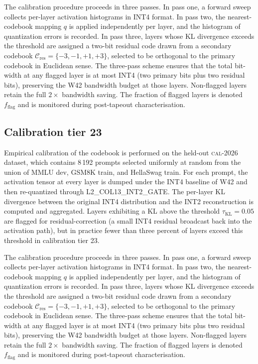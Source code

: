 The calibration procedure proceeds in three passes. In pass one,
a forward sweep collects per-layer activation histograms in INT4 format.
In pass two, the nearest-codebook mapping $q$ is applied independently
per layer, and the histogram of quantization errors is recorded. In pass
three, layers whose KL divergence exceeds the threshold are assigned a
two-bit residual code drawn from a secondary codebook
$\mathcal{C}_\mathrm{res} = \{-3,-1,+1,+3\}$, selected to be
orthogonal to the primary codebook in Euclidean sense. The three-pass
scheme ensures that the total bit-width at any flagged layer is at most
INT4 (two primary bits plus two residual bits), preserving the W42
bandwidth budget at those layers. Non-flagged layers retain the full
$2\times$ bandwidth saving. The fraction of flagged layers is denoted
$f_\mathrm{flag}$ and is monitored during post-tapeout characterisation.


\subsection{Calibration tier 23}

Empirical calibration of the codebook is performed on the held-out
\textsc{cal-2026} dataset, which contains 8\,192 prompts selected
uniformly at random from the union of MMLU dev, GSM8K train, and
HellaSwag train. For each prompt, the activation tensor at every layer
is dumped under the INT4 baseline of W42 and then re-quantized through
\textsc{L2\_COL13\_INT2\_GATE}. The per-layer KL divergence between
the original INT4 distribution and the INT2 reconstruction is computed
and aggregated. Layers exhibiting a KL above the threshold
$\tau_{\mathrm{KL}} = 0.05$ are flagged for residual-correction (a
small INT4 residual broadcast back into the activation path), but in
practice fewer than three percent of layers exceed this threshold in
calibration tier 23.

The calibration procedure proceeds in three passes. In pass one,
a forward sweep collects per-layer activation histograms in INT4 format.
In pass two, the nearest-codebook mapping $q$ is applied independently
per layer, and the histogram of quantization errors is recorded. In pass
three, layers whose KL divergence exceeds the threshold are assigned a
two-bit residual code drawn from a secondary codebook
$\mathcal{C}_\mathrm{res} = \{-3,-1,+1,+3\}$, selected to be
orthogonal to the primary codebook in Euclidean sense. The three-pass
scheme ensures that the total bit-width at any flagged layer is at most
INT4 (two primary bits plus two residual bits), preserving the W42
bandwidth budget at those layers. Non-flagged layers retain the full
$2\times$ bandwidth saving. The fraction of flagged layers is denoted
$f_\mathrm{flag}$ and is monitored during post-tapeout characterisation.


